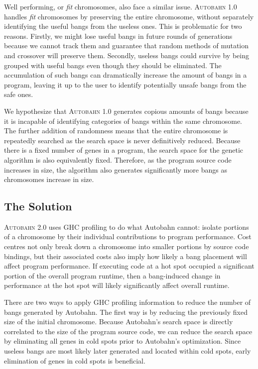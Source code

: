 \documentclass[format=sigplan]{acmart}
\newcommand{\hotspot}[0]{hot spot}
\newcommand{\coldspots}[0]{cold spots}
\newcommand{\useful}[0]{useful}
\newcommand{\useless}[0]{useless}
\newcommand{\Ao}[0]{\textsc{Autobahn 1.0}}
\newcommand{\At}[0]{\textsc{Autobahn 2.0}}
\newcommand{\fit}[0]{\textit{fit}}
\begin{document}
Well performing, or \fit{} chromosomes, also face a similar issue. \Ao{} handles \fit{} chromosomes by preserving the entire chromosome, without separately identifying the \useful{} bangs from the \useless{} ones. This is problematic for two reasons. Firstly, we might lose \useful{} bangs in future rounds of generations because we cannot track them and guarantee that random methods of mutation and crossover will preserve them. Secondly, \useless{} bangs could survive by being grouped with \useful{} bangs even though they should be eliminated. The accumulation of such bangs can dramatically increase the amount of bangs in a program, leaving it up to the user to identify potentially unsafe bangs from the safe ones. 

We hypothesize that \Ao{} generates copious amounts of bangs because it is incapable of identifying categories of bangs within the same chromosome. The further addition of randomness means that the entire chromosome is repeatedly searched as the search space is never definitively reduced. Because there is a fixed number of genes in a program, the search space for the genetic algorithm is also equivalently fixed. Therefore, as the program source code increases in size, the algorithm also generates significantly more bangs as chromosomes increase in size. 

\subsection{The Solution}

\At{} uses GHC profiling to do what Autobahn cannot: isolate portions of a chromosome by their individual contributions to program performance. Cost centres not only break down a chromosome into smaller portions by source code bindings, but their associated costs also imply how likely a bang placement will affect program performance. If executing code at a \hotspot{} occupied a significant portion of the overall program runtime, then a bang-induced change in performance at the \hotspot{} will likely significantly affect overall runtime. 

There are two ways to apply GHC profiling information to reduce the number of bangs generated by Autobahn. The first way is by reducing the previously fixed size of the initial chromosome. Because Autobahn's search space is directly correlated to the size of the program source code, we can reduce the search space by eliminating all genes in \coldspots{} prior to Autobahn's optimization. Since \useless{} bangs are most likely later generated and located within \coldspots{}, early elimination of genes in \coldspots{} is beneficial. 
\end{document}
